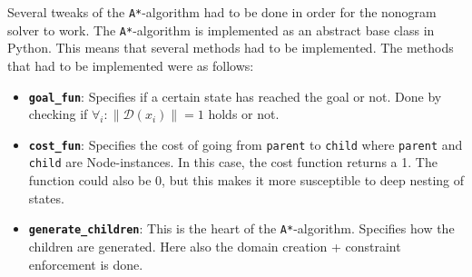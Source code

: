 Several tweaks of the \texttt{A*}-algorithm had to be done in order for the
nonogram solver to work. The \texttt{A*}-algorithm is implemented as an abstract base class in Python.
This means that several methods had to be implemented.  The methods that had to
be implemented were as follows:

\begin{itemize}
    \item \textbf{\texttt{goal\_fun}}: Specifies if a certain state has reached
    the goal or not. Done by checking if $\forall_i: \|\mathcal{D}(x_i)\| = 1$
    holds or not.

    \item \textbf{\texttt{cost\_fun}}: Specifies the cost of going from \texttt{parent}
    to \texttt{child} where \texttt{parent} and \texttt{child} are
    Node-instances. In this case, the cost function returns a 1. The function
    could also be 0, but this makes it more susceptible to deep nesting of
    states.
    
    \item \textbf{\texttt{generate\_children}}: This is the heart of the
    \texttt{A*}-algorithm. Specifies how the children are generated. Here also
    the domain creation + constraint enforcement is done.

\end{itemize}
